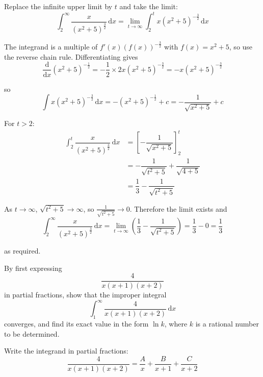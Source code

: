 \documentclass[leqno]{article}
\begin{document}
\begin{enumerate}[
  label=\textbf{\arabic*.},
  leftmargin=*,
  topsep=0pt,
  partopsep=0pt,
  parsep=0pt
]
\vspace*{10pt}

\begin{djsSolution}
Replace the infinite upper limit by \(t\) and take the limit:
\[
\int_{2}^{\infty} \dfrac{x}{(x^{2}+5)^{\frac{3}{2}}}\,\mathrm{d}x=\lim_{t\to\infty}\int_{2}^{t} x\left(x^{2}+5\right)^{-\frac{3}{2}}\,\mathrm{d}x
\]

The integrand is a multiple of \(f'(x)\left(f(x)\right)^{-\frac{3}{2}}\) with \(f(x)=x^2+5\), so use the reverse chain rule. Differentiating gives
\[
\frac{\mathrm{d}}{\mathrm{d}x}\left(x^{2}+5\right)^{-\frac{1}{2}}=-\dfrac{1}{2}\times 2x\left(x^{2}+5\right)^{-\frac{3}{2}}=-x\left(x^{2}+5\right)^{-\frac{3}{2}}
\]

so
\[
\int x\left(x^{2}+5\right)^{-\frac{3}{2}}\,\mathrm{d}x=-\left(x^{2}+5\right)^{-\frac{1}{2}}+c=-\dfrac{1}{\sqrt{x^{2}+5}}+c
\]

For \(t>2\):
\begin{align*}
\int_{2}^{t} \dfrac{x}{(x^{2}+5)^{\frac{3}{2}}}\,\mathrm{d}x&=\left[-\dfrac{1}{\sqrt{x^{2}+5}}\right]_{2}^{t}\\
&=-\dfrac{1}{\sqrt{t^{2}+5}}+\dfrac{1}{\sqrt{4+5}}\\
&=\dfrac{1}{3}-\dfrac{1}{\sqrt{t^{2}+5}}
\end{align*}

As \(t\to\infty\), \(\sqrt{t^{2}+5}\to\infty\), so \(\frac{1}{\sqrt{t^{2}+5}}\to 0\). Therefore the limit exists and
\[
\int_{2}^{\infty} \dfrac{x}{(x^{2}+5)^{\frac{3}{2}}}\,\mathrm{d}x=\lim_{t\to\infty}\left(\dfrac{1}{3}-\dfrac{1}{\sqrt{t^{2}+5}}\right)=\dfrac{1}{3}-0=\dfrac{1}{3}
\]

as required.
\end{djsSolution}

\newpage

\questionitem

By first expressing
\[\dfrac{4}{x(x+1)(x+2)}\]
in partial fractions, show that the improper integral
\[\int_1^{\infty} \dfrac{4}{x(x+1)(x+2)}\,\mathrm{d}x\]
converges, and find its exact value in the form $\ln k$, where $k$ is a rational number to be determined.  \\

\vspace*{10pt}

\begin{djsSolution}
Write the integrand in partial fractions:
\[
\dfrac{4}{x(x+1)(x+2)}=\dfrac{A}{x}+\dfrac{B}{x+1}+\dfrac{C}{x+2}
\]


\end{djsSolution}
\end{enumerate}
\end{document}
